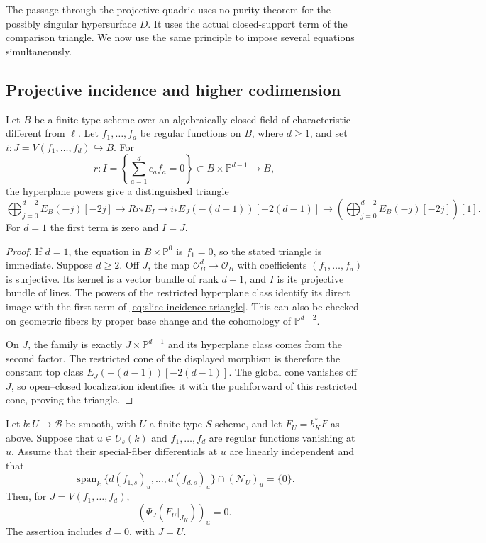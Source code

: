The passage through the projective quadric uses no purity theorem for
the possibly singular hypersurface $D$.  It uses the actual
closed-support term of the comparison triangle.  We now use the same
principle to impose several equations simultaneously.

\subsection{Projective incidence and higher codimension}

\begin{lemma}\label{slice:incidence}
Let $B$ be a finite-type scheme over an algebraically closed field of
characteristic different from $\ell$.  Let $f_1,\ldots,f_d$ be
regular functions on $B$, where $d\geq1$, and set
$i:J=V(f_1,\ldots,f_d)\hookrightarrow B$.  For
\[
 r:I=\left\{\sum_{a=1}^d c_af_a=0\right\}
           \subset B\times\mathbb P^{d-1}\longrightarrow B,
\]
the hyperplane powers give a distinguished triangle
\begin{equation}\label{eq:slice-incidence-triangle}
 \bigoplus_{j=0}^{d-2}E_B(-j)[-2j]
 \longrightarrow Rr_*E_I
 \longrightarrow i_*E_J(-(d-1))[-2(d-1)]
 \longrightarrow
 \left(\bigoplus_{j=0}^{d-2}E_B(-j)[-2j]\right)[1].
\end{equation}
For $d=1$ the first term is zero and $I=J$.
\end{lemma}

\begin{proof}
If $d=1$, the equation in $B\times\mathbb P^0$ is $f_1=0$,
so the stated triangle is immediate.  Suppose $d\geq2$.
Off $J$, the map $\mathcal O_B^d\to\mathcal O_B$ with coefficients
$(f_1,\ldots,f_d)$ is surjective.  Its kernel is a vector bundle of
rank $d-1$, and $I$ is its projective bundle of lines.  The powers of
the restricted hyperplane class identify its direct image with the
first term of \eqref{eq:slice-incidence-triangle}.  This can also be
checked on geometric fibers by proper base change and the cohomology
of $\mathbb P^{d-2}$.

On $J$, the family is exactly $J\times\mathbb P^{d-1}$ and its
hyperplane class comes from the second factor.  The restricted cone
of the displayed morphism is therefore the constant top class
$E_J(-(d-1))[-2(d-1)]$.  The global cone vanishes off $J$, so
open--closed localization identifies it with the pushforward of this
restricted cone, proving the triangle.
\end{proof}

\begin{proposition}\label{slice:higher}
Let $b:U\to\mathcal B$ be smooth, with $U$ a finite-type $S$-scheme,
and let $F_U=b_K^*F$ as above.  Suppose that $u\in U_s(k)$ and
$f_1,\ldots,f_d$ are regular functions vanishing at $u$.  Assume
that their special-fiber differentials at $u$ are linearly independent
and that
\[
 \operatorname{span}_k\{d(f_{1,s})_u,\ldots,d(f_{d,s})_u\}
                     \cap(\mathcal N_U)_u=\{0\}.
\]
Then, for $J=V(f_1,\ldots,f_d)$,
\[
                         (\Psi_J(F_U|_{J_K}))_u=0.
\]
The assertion includes $d=0$, with $J=U$.
\end{proposition}

